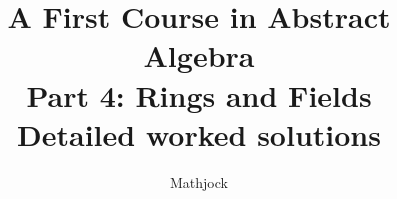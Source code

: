 
\title{\textbf{A First Course in Abstract Algebra}\\[0.3em]Part 4: Rings and Fields\\[0.3em]\large Detailed worked solutions}
\author{Mathjock}
\date{}

\maketitle
\bookinfo
\tableofcontents
\clearpage
\renewcommand{\thesection}{18}
\renewcommand{\theHsection}{fraleigh.18}

\clearpage
\renewcommand{\thesection}{19}
\renewcommand{\theHsection}{fraleigh.19}

\clearpage
\renewcommand{\thesection}{20}
\renewcommand{\theHsection}{fraleigh.20}

\clearpage
\renewcommand{\thesection}{21}
\renewcommand{\theHsection}{fraleigh.21}

\clearpage
\renewcommand{\thesection}{22}
\renewcommand{\theHsection}{fraleigh.22}

\clearpage
\renewcommand{\thesection}{23}
\renewcommand{\theHsection}{fraleigh.23}

\clearpage
\renewcommand{\thesection}{24}
\renewcommand{\theHsection}{fraleigh.24}

\clearpage
\renewcommand{\thesection}{25}
\renewcommand{\theHsection}{fraleigh.25}


